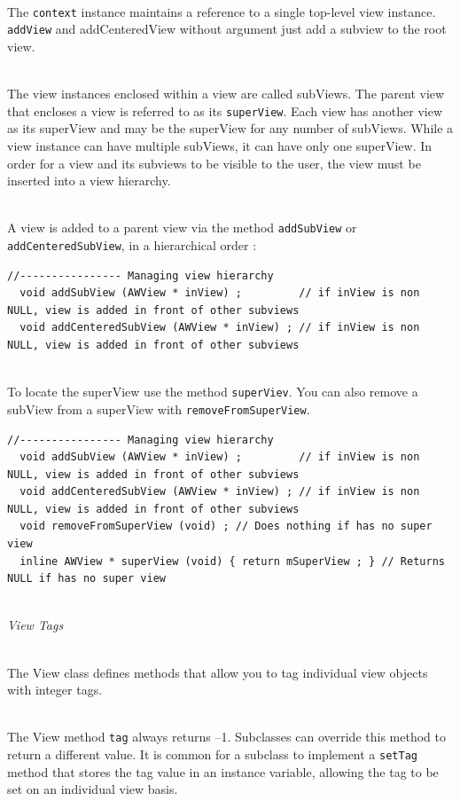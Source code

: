 \documentclass[a4paper,11pt]{extarticle}
\begin{document}
~\\The \texttt{context} instance maintains a reference to a single top-level view instance. \texttt{addView} and addCenteredView without argument just add a subview to the root view.

~\\The view instances enclosed within a view are called subViews. The parent view that encloses a view is referred to as its \texttt{superView}. Each view has another view as its superView and may be the superView for any number of subViews. While a view instance can have multiple subViews, it can have only one superView. In order for a view and its subviews to be visible to the user, the view must be inserted into a view hierarchy.

~\\ A view is added to a parent view via the method \texttt{addSubView} or \texttt{addCenteredSubView}, in a hierarchical order :
\begin{lstlisting}[language=Arduinonl]
//---------------- Managing view hierarchy
  void addSubView (AWView * inView) ;         // if inView is non NULL, view is added in front of other subviews
  void addCenteredSubView (AWView * inView) ; // if inView is non NULL, view is added in front of other subviews
\end{lstlisting}


~\\To locate the superView use the method \texttt{superViev}. You can also remove a subView from a superView with \texttt{removeFromSuperView}.

\begin{lstlisting}[language=Arduinonl]
//---------------- Managing view hierarchy
  void addSubView (AWView * inView) ;         // if inView is non NULL, view is added in front of other subviews
  void addCenteredSubView (AWView * inView) ; // if inView is non NULL, view is added in front of other subviews
  void removeFromSuperView (void) ; // Does nothing if has no super view
  inline AWView * superView (void) { return mSuperView ; } // Returns NULL if has no super view
\end{lstlisting}

~\\\emph{View Tags}

~\\The View class defines methods that allow you to tag individual view objects with integer tags.

~\\The View method \texttt{tag} always returns –1. Subclasses can override this method to return a different value. It is common for a subclass to implement a \texttt{setTag} method that stores the tag value in an instance variable, allowing the tag to be set on an individual view basis. 
\end{document}

